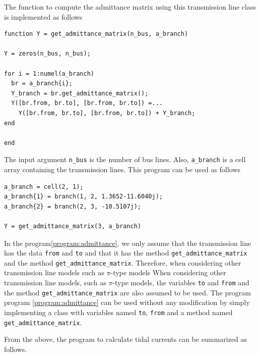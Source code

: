 \documentclass[graybox, envcountchap]{svmult}
\begin{document}
\begin{example}
The function to compute the admittance matrix using this transmission line class is implemented as follows
\smallskip
\begin{PROGRAMA}[count,title={get\_admittance\_matrix.m}]\label{program:admittance}
\begin{verbatim}
function Y = get_admittance_matrix(n_bus, a_branch)

Y = zeros(n_bus, n_bus);

for i = 1:numel(a_branch)
  br = a_branch{i};
  Y_branch = br.get_admittance_matrix();
  Y([br.from, br.to], [br.from, br.to]) =...
    Y([br.from, br.to], [br.from, br.to]) + Y_branch;
end

end
\end{verbatim}
\end{PROGRAMA}

The input argument \verb|n_bus| is the number of bus lines.
Also, \verb|a_branch| is a cell array containing the transmission lines.
This program can be used as follows

\smallskip
\begin{PROGRAMA}[count,title={main\_admittance\_matrix.m}]\label{program:main_admittance}
\begin{verbatim}
a_branch = cell(2, 1);
a_branch{1} = branch(1, 2, 1.3652-11.6040j);
a_branch{2} = branch(2, 3, -10.5107j);

Y = get_admittance_matrix(3, a_branch)
\end{verbatim}
\end{PROGRAMA}


In the program\nobreak\ref{program:admittance}, we only assume that the transmission line has the data \verb|from| and \verb|to| and that it has the method \verb|get_admittance_matrix| and the method \verb|get_admittance_matrix|.
Therefore, when considering other transmission line models such as $\pi$-type models When considering other transmission line models, such as $\pi$-type models, the variables \verb|to| and \verb|from| and the method \verb|get_admittance_matrix| are also assumed to be used.
The program program \nobreak\ref{program:admittance} can be used without any modification by simply implementing a class with variables named \verb|to|, \verb|from| and a method named \verb|get_admittance_matrix|.
\end{example}

From the above, the program to calculate tidal currents can be summarized as follows.
\end{document}
